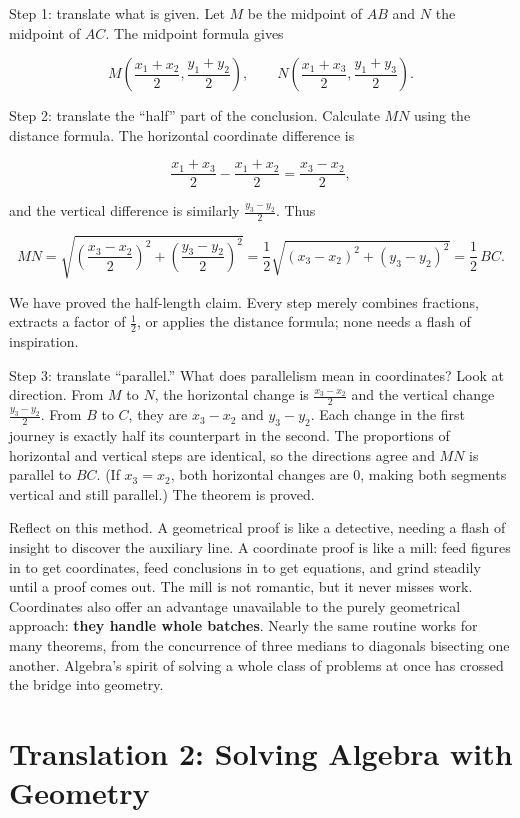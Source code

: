 Step 1: translate what is given. Let $M$ be the midpoint of $AB$ and $N$ the midpoint of $AC$. The midpoint formula gives

\[
M\left(\frac{x_{1}+x_{2}}{2},\frac{y_{1}+y_{2}}{2}\right),\qquad
N\left(\frac{x_{1}+x_{3}}{2},\frac{y_{1}+y_{3}}{2}\right).
\]

Step 2: translate the ``half'' part of the conclusion. Calculate $MN$ using the distance formula. The horizontal coordinate difference is

\[
\frac{x_{1}+x_{3}}{2}-\frac{x_{1}+x_{2}}{2}=\frac{x_{3}-x_{2}}{2},
\]

and the vertical difference is similarly $\frac{y_{3}-y_{2}}{2}$. Thus

\[
MN=\sqrt{\left(\frac{x_{3}-x_{2}}{2}\right)^{2}+\left(\frac{y_{3}-y_{2}}{2}\right)^{2}}
=\frac{1}{2}\sqrt{(x_{3}-x_{2})^{2}+(y_{3}-y_{2})^{2}}=\frac{1}{2}\,BC.
\]

We have proved the half-length claim. Every step merely combines fractions, extracts a factor of $\frac{1}{2}$, or applies the distance formula; none needs a flash of inspiration.

Step 3: translate ``parallel.'' What does parallelism mean in coordinates? Look at direction. From $M$ to $N$, the horizontal change is $\frac{x_{3}-x_{2}}{2}$ and the vertical change $\frac{y_{3}-y_{2}}{2}$. From $B$ to $C$, they are $x_{3}-x_{2}$ and $y_{3}-y_{2}$. Each change in the first journey is exactly half its counterpart in the second. The proportions of horizontal and vertical steps are identical, so the directions agree and $MN$ is parallel to $BC$. (If $x_{3}=x_{2}$, both horizontal changes are $0$, making both segments vertical and still parallel.) The theorem is proved.

Reflect on this method. A geometrical proof is like a detective, needing a flash of insight to discover the auxiliary line. A coordinate proof is like a mill: feed figures in to get coordinates, feed conclusions in to get equations, and grind steadily until a proof comes out. The mill is not romantic, but it never misses work. Coordinates also offer an advantage unavailable to the purely geometrical approach: \textbf{they handle whole batches}. Nearly the same routine works for many theorems, from the concurrence of three medians to diagonals bisecting one another. Algebra's spirit of solving a whole class of problems at once has crossed the bridge into geometry.

\section{Translation 2: Solving Algebra with Geometry}

